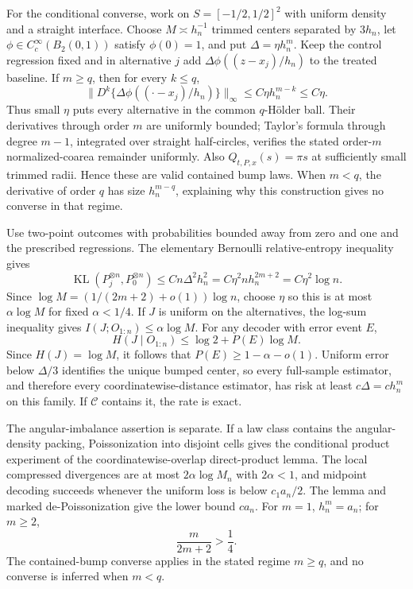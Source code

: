 For the conditional converse, work on \(S=[-1/2,1/2]^2\) with uniform density and a straight interface.  Choose \(M\asymp h_n^{-1}\) trimmed centers separated by \(3h_n\), let \(\phi\in C_c^\infty(B_2(0,1))\) satisfy \(\phi(0)=1\), and put \(\Delta=\eta h_n^m\).  Keep the control regression fixed and in alternative \(j\) add \(\Delta\phi((z-x_j)/h_n)\) to the treated baseline.  If \(m\geq q\), then for every \(k\leq q\),
\[
 \|D^k\{\Delta\phi((\cdot-x_j)/h_n)\}\|_\infty
 \leq C\eta h_n^{m-k}\leq C\eta.
\]
Thus small \(\eta\) puts every alternative in the common \(q\)-H\"older ball.  Their derivatives through order \(m\) are uniformly bounded; Taylor's formula through degree \(m-1\), integrated over straight half-circles, verifies the stated order-\(m\) normalized-coarea remainder uniformly.  Also \(Q_{t,P,x}(s)=\pi s\) at sufficiently small trimmed radii.  Hence these are valid contained bump laws.  When \(m<q\), the derivative of order \(q\) has size \(h_n^{m-q}\), explaining why this construction gives no converse in that regime.

Use two-point outcomes with probabilities bounded away from zero and one and the prescribed regressions.  The elementary Bernoulli relative-entropy inequality gives
\[
 \operatorname{KL}(P_j^{\otimes n},P_0^{\otimes n})
 \leq Cn\Delta^2h_n^2
 =C\eta^2nh_n^{2m+2}=C\eta^2\log n.
\]
Since \(\log M=(1/(2m+2)+o(1))\log n\), choose \(\eta\) so this is at most \(\alpha\log M\) for fixed \(\alpha<1/4\).  If \(J\) is uniform on the alternatives, the log-sum inequality gives \(I(J;O_{1:n})\leq\alpha\log M\).  For any decoder with error event \(E\),
\[
 H(J\mid O_{1:n})\leq\log2+P(E)\log M.
\]
Since \(H(J)=\log M\), it follows that \(P(E)\geq1-\alpha-o(1)\).  Uniform error below \(\Delta/3\) identifies the unique bumped center, so every full-sample estimator, and therefore every coordinatewise-distance estimator, has risk at least \(c\Delta=ch_n^m\) on this family.  If \(\mathcal C\) contains it, the rate is exact.

The angular-imbalance assertion is separate.  If a law class contains the angular-density packing, Poissonization into disjoint cells gives the conditional product experiment of the coordinatewise-overlap direct-product lemma.  The local compressed divergences are at most \(2\alpha\log M_n\) with \(2\alpha<1\), and midpoint decoding succeeds whenever the uniform loss is below \(c_1a_n/2\).  The lemma and marked de-Poissonization give the lower bound \(ca_n\).  For \(m=1\), \(h_n^m=a_n\); for \(m\geq2\),
\[
 \frac{m}{2m+2}>\frac14.
\]
The contained-bump converse applies in the stated regime \(m\geq q\), and no converse is inferred when \(m<q\).

